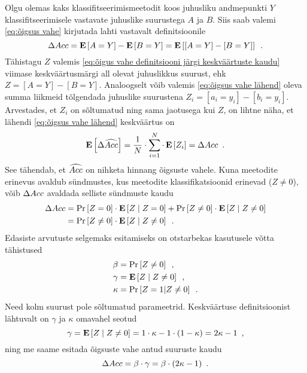 Olgu olemas kaks klassifitseerimismeetodit koos juhusliku andmepunkti $Y$ klassifitseerimisele vastavate juhuslike suurustega $A$ ja $B$. Siis saab valemi \eqref{eq:õigsus vahe} kirjutada lahti vastavalt definitsioonile
\begin{equation}
    \label{eq:õigus vahe definitsiooni järgi keskväärtuste kaudu}
    \Delta Acc=\operatorname*{\mathbf{E}}\left[A=Y\right]-\operatorname*{\mathbf{E}}\left[B=Y\right]=\operatorname*{\mathbf{E}}\left[[A=Y]-[B=Y]\right] \enspace.
\end{equation}
Tähistagu $Z$ valemis \eqref{eq:õigus vahe definitsiooni järgi keskväärtuste kaudu} viimase keskväärtusmärgi all olevat juhuslikkus suurust, ehk $Z=[A=Y]-[B=Y]$. Analoogselt võib valemis \eqref{eq:õigsus vahe lähend} oleva summa liikmeid tõlgendada juhuslike suurustena $Z_i=[a_i=y_i]-[b_i=y_i]$. Arvestades, et $Z_i$ on sõltumatud ning sama jaotusega kui $Z$, on lihtne näha, et lähendi \eqref{eq:õigsus vahe lähend} keskväärtus on
\begin{equation}
    \operatorname*{\mathbf{E}}\left[\Delta\widehat{Acc}\right]=\frac{1}{N}\cdot\sum_{i=1}^N\cdot\operatorname*{\mathbf{E}}\left[Z_i\right]=\Delta Acc \enspace.
\end{equation}
See tähendab, et $\widehat{Acc}$ on nihketa hinnang õigsuste vahele. Kuna meetodite erinevus avaldub sündmustes, kus meetodite klassifikatsioonid erinevad ($Z\neq 0$), võib $\Delta Acc$ avaldada selliste sündmuste kaudu
\begin{align*}
    \Delta Acc&=\Pr\left[Z=0\right]\cdot\operatorname*{\mathbf{E}}\left[Z \mid Z = 0\right]+\Pr\left[Z \neq 0\right]\cdot\operatorname*{\mathbf{E}}\left[Z \mid Z \neq 0\right] \\
    &=\Pr\left[Z \neq 0\right]\cdot\operatorname*{\mathbf{E}}\left[Z \mid Z \neq 0\right] \enspace.
\end{align*}
Edasiste arvutuste selgemaks esitamiseks on otstarbekas kasutusele võtta tähistused
\begin{align}
    \beta&=\Pr\left[Z\neq0\right] \enspace, \label{eq:beta} \\
    \gamma&=\operatorname*{\mathbf{E}}\left[Z \mid Z \neq 0\right] \enspace, \label{eq:gamma} \\
    \kappa&=\Pr\left[Z=1|Z\neq0\right] \enspace. \label{eq:kappa}
\end{align}
Need kolm suurust pole sõltumatud parameetrid. Keskväärtuse definitsioonist lähtuvalt on $\gamma$ ja $\kappa$ omavahel seotud
\begin{equation*}
    \gamma=\operatorname*{\mathbf{E}}\left[Z\mid Z \neq 0\right]=1\cdot\kappa-1\cdot(1-\kappa)=2\kappa-1 \enspace,
\end{equation*}
ning me saame esitada õigsuste vahe antud suuruste kaudu
\begin{equation}
    \label{eq:õigsus vahe tähistega}
    \Delta Acc=\beta\cdot\gamma=\beta\cdot(2\kappa-1) \enspace.
\end{equation}

